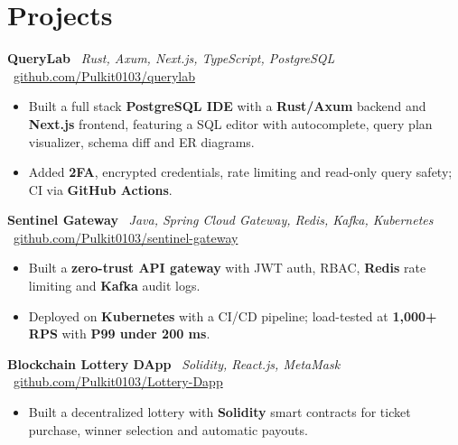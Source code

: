 \documentclass[10pt]{article}
\begin{document}
\section*{Projects}
\vspace{5pt}
\textbf{QueryLab} \textbar\ \textit{Rust, Axum, Next.js, TypeScript, PostgreSQL} \textbar\ \href{https://github.com/Pulkit0103/querylab}{github.com/Pulkit0103/querylab}
\vspace{3pt}
\begin{itemize}
    \item Built a full stack \textbf{PostgreSQL IDE} with a \textbf{Rust/Axum} backend and \textbf{Next.js} frontend, featuring a SQL editor with autocomplete, query plan visualizer, schema diff and ER diagrams.
    \item Added \textbf{2FA}, encrypted credentials, rate limiting and read-only query safety; CI via \textbf{GitHub Actions}.
\end{itemize}
\vspace{5pt}
\textbf{Sentinel Gateway} \textbar\ \textit{Java, Spring Cloud Gateway, Redis, Kafka, Kubernetes} \textbar\ \href{https://github.com/Pulkit0103/sentinel-gateway}{github.com/Pulkit0103/sentinel-gateway}

\begin{itemize}
    \item Built a \textbf{zero-trust API gateway} with JWT auth, RBAC, \textbf{Redis} rate limiting and \textbf{Kafka} audit logs.
    \item Deployed on \textbf{Kubernetes} with a CI/CD pipeline; load-tested at \textbf{1,000+ RPS} with \textbf{P99 under 200 ms}.
\end{itemize}
\vspace{5pt}
\textbf{Blockchain Lottery DApp} \textbar\ \textit{Solidity, React.js, MetaMask} \textbar\ \href{https://github.com/Pulkit0103/Lottery-Dapp}{github.com/Pulkit0103/Lottery-Dapp}
\begin{itemize}
    \item Built a decentralized lottery with \textbf{Solidity} smart contracts for ticket purchase, winner selection and automatic payouts.
\end{itemize}

\end{document}
